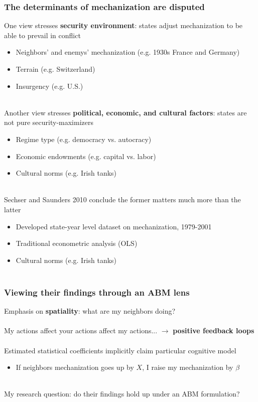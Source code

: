 \documentclass{beamer}
\begin{document}
\begin{frame}
	\frametitle{The determinants of mechanization are disputed}
	One view stresses \textbf{security environment}: states adjust
	mechanization to be able to prevail in conflict
	\begin{itemize}
		\item \small Neighbors' and enemys' mechanization (e.g. 1930s
			France and Germany)
		\item \small Terrain (e.g. Switzerland)
		\item \small Insurgency (e.g. U.S.)\\~\\
	\end{itemize}

	Another view stresses \textbf{political, economic, and cultural
	factors}: states are not pure security-maximizers
	\begin{itemize}
		\item \small Regime type (e.g. democracy vs. autocracy)
		\item \small Economic endowments (e.g. capital vs. labor)
		\item \small Cultural norms (e.g. Irish tanks)\\~\\
	\end{itemize}

	Sechser and Saunders 2010 conclude the former matters much more than the
	latter
	\begin{itemize}
		\item \small Developed state-year level dataset on
			mechanization, 1979-2001
		\item \small Traditional econometric analysis (OLS)
		\item \small Cultural norms (e.g. Irish tanks)\\~\\
	\end{itemize}

\end{frame}

\begin{frame}
	\frametitle{Viewing their findings through an ABM lens}

	Emphasis on \textbf{spatiality}: what are my neighbors doing? \\~\\

	My actions affect your actions affect my actions... $\to$ \textbf{positive feedback loops} \\~\\

	Estimated statistical coefficients implicitly claim particular cognitive model
	\begin{itemize}
		\item \small If neighbors mechanization goes up by $X$, I raise my mechanization by $\beta$ \\~\\
	\end{itemize}

	My research question: do their findings hold up under an ABM formulation?
\end{frame}
\end{document}
